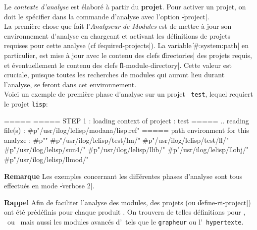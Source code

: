 Le {\it contexte d'analyse} est \'{e}labor\'{e} \`{a} partir du {\bf projet}.
Pour activer un projet, on doit le sp\'{e}cifier dans la commande
d'analyse avec l'option \|-project|.\\
La premi\`{e}re chose que fait l'{\em Analyseur de Modules} est de mettre
\`{a} jour son environnement d'analyse en chargeant et activant les
d\'{e}finitions de 
projets requises pour cette analyse (cf \|required-projects|).
La variable \|#:system:path| en particulier, est mise \`{a} jour avec le
contenu des clefs \|directories| des projets requis, et \'{e}ventuellement
le contenu des clefs \|ll-module-directory|. Cette valeur est
cruciale, puisque toutes les recherches de modules qui auront lieu
durant l'analyse, se feront dans cet environnement. \\
Voici un exemple de premi\`{e}re phase d'analyse sur un projet {\tt
test}, lequel requiert le projet {\tt lisp}: \\

\begin{Longcode*}
=====
===== STEP 1 : loading context of project : test
=====
.. reading file(s) : #p"/usr/ilog/lelisp/modana/lisp.ref"
===== path environment for this analyze :
   #p""
   #p"/usr/ilog/lelisp/test/lm/"
   #p"/usr/ilog/lelisp/test/ll/"
   #p"/usr/ilog/lelisp/sun4/"
   #p"/usr/ilog/lelisp/llib/"
   #p"/usr/ilog/lelisp/llobj/"
   #p"/usr/ilog/lelisp/llmod/"
\end{Longcode*}

\begin{Side}{\bf Remarque}
Les exemples concernant les diff\'{e}rentes
phases  d'analyse sont tous effectu\'{e}s en mode \|-verbose 2|.
\end{Side}

\begin{Side}{\bf Rappel}
Afin de faciliter l'analyse des modules, des projets (ou
\|define-rt-project|) ont \'{e}t\'{e} pr\'{e}d\'{e}finis pour chaque produit \Ilog.
On trouvera de telles d\'{e}finitions pour \LeLisp, \Aida\ ou
\Smeci\ mais aussi
les modules avanc\'{e}s d'\Aida\ tels que le {\tt grapheur} ou l'{\tt
hypertexte}. 
\end{Side}


